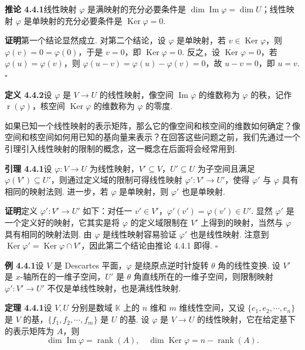 \documentclass[UTF8,12pt,a4paper,fontset=fandol]{ctexart}
\begin{document}
\noindent\textbf{推论 4.4.1}\quad 线性映射 $\varphi$ 是满映射的充分必要条件是 $\dim\operatorname{Im}\varphi=\dim U$；线性映射 $\varphi$ 是单映射的充分必要条件是 $\operatorname{Ker}\varphi=0$.

\noindent\textbf{证明}\quad 第一个结论显然成立. 对第二个结论，设 $\varphi$ 是单映射，若 $v\in\operatorname{Ker}\varphi$，则 $\varphi(v)=0=\varphi(0)$，于是 $v=0$，即 $\operatorname{Ker}\varphi=0$. 反之，设 $\operatorname{Ker}\varphi=0$，若 $\varphi(u)=\varphi(v)$，则 $\varphi(u-v)=\varphi(u)-\varphi(v)=0$，故 $u-v=0$，即 $u=v$. $\square$

\noindent\textbf{定义 4.4.2}\quad 设 $\varphi$ 是 $V\to U$ 的线性映射，像空间 $\operatorname{Im}\varphi$ 的维数称为 $\varphi$ 的秩，记作 $\operatorname{r}(\varphi)$，核空间 $\operatorname{Ker}\varphi$ 的维数称为 $\varphi$ 的零度.

如果已知一个线性映射的表示矩阵，那么它的像空间和核空间的维数如何确定？像空间和核空间如何用已知的基向量来表示？在回答这些问题之前，我们先通过一个引理引入线性映射的限制的概念，这一概念在后面将会经常用到.

\noindent\textbf{引理 4.4.1}\quad 设 $\varphi:V\to U$ 为线性映射，$V'\subseteq V$，$U'\subseteq U$ 为子空间且满足 $\varphi(V')\subseteq U'$，则通过定义域的限制可得线性映射 $\varphi':V'\to U'$，使得 $\varphi'$ 与 $\varphi$ 具有相同的映射法则. 进一步，若 $\varphi$ 是单映射，则 $\varphi'$ 也是单映射.

\noindent\textbf{证明}\quad 定义 $\varphi':V'\to U'$ 如下：对任一 $v'\in V'$，$\varphi'(v')=\varphi(v')\in U'$. 显然 $\varphi'$ 是一个定义好的映射，它其实是将 $\varphi$ 的定义域限制在 $V'$ 上得到的映射，当然与 $\varphi$ 具有相同的映射法则. 由 $\varphi$ 是线性映射容易验证 $\varphi'$ 也是线性映射. 注意到 $\operatorname{Ker}\varphi'=\operatorname{Ker}\varphi\cap V'$，因此第二个结论由推论 4.4.1 即得. $\square$

\noindent\textbf{例 4.4.1}\quad 设 $V$ 是 Descartes 平面，$\varphi$ 是绕原点逆时针旋转 $\theta$ 角的线性变换. 设 $V'$ 是 $x$-轴所在的一维子空间，$U'$ 是 $\theta$ 角直线所在的一维子空间，则限制映射 $\varphi':V'\to U'$ 不仅是单线性映射，也是满线性映射.

\noindent\textbf{定理 4.4.1}\quad 设 $V,U$ 分别是数域 $\mathbb{K}$ 上的 $n$ 维和 $m$ 维线性空间，又设 $\{e_1,e_2,\cdots,e_n\}$ 是 $V$ 的基，$\{f_1,f_2,\cdots,f_m\}$ 是 $U$ 的基. 设 $\varphi$ 是 $V\to U$ 的线性映射，它在给定基下的表示矩阵为 $A$，则
\[
\dim\operatorname{Im}\varphi=\operatorname{rank}(A),\quad \dim\operatorname{Ker}\varphi=n-\operatorname{rank}(A).
\]
\end{document}
